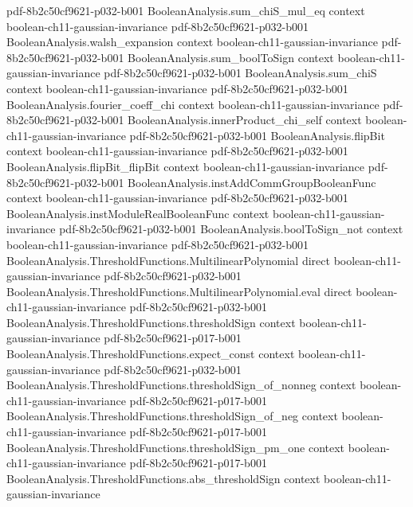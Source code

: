 \begin{theorem}
  {pdf-8b2c50cf9621-p032-b001}
\proofstep
  {BooleanAnalysis.sum_chiS_mul_eq}
  {context}
  {boolean-ch11-gaussian-invariance}
  {pdf-8b2c50cf9621-p032-b001}
\proofstep
  {BooleanAnalysis.walsh_expansion}
  {context}
  {boolean-ch11-gaussian-invariance}
  {pdf-8b2c50cf9621-p032-b001}
\proofstep
  {BooleanAnalysis.sum_boolToSign}
  {context}
  {boolean-ch11-gaussian-invariance}
  {pdf-8b2c50cf9621-p032-b001}
\proofstep
  {BooleanAnalysis.sum_chiS}
  {context}
  {boolean-ch11-gaussian-invariance}
  {pdf-8b2c50cf9621-p032-b001}
\proofstep
  {BooleanAnalysis.fourier_coeff_chi}
  {context}
  {boolean-ch11-gaussian-invariance}
  {pdf-8b2c50cf9621-p032-b001}
\proofstep
  {BooleanAnalysis.innerProduct_chi_self}
  {context}
  {boolean-ch11-gaussian-invariance}
  {pdf-8b2c50cf9621-p032-b001}
\proofstep
  {BooleanAnalysis.flipBit}
  {context}
  {boolean-ch11-gaussian-invariance}
  {pdf-8b2c50cf9621-p032-b001}
\proofstep
  {BooleanAnalysis.flipBit_flipBit}
  {context}
  {boolean-ch11-gaussian-invariance}
  {pdf-8b2c50cf9621-p032-b001}
\proofstep
  {BooleanAnalysis.instAddCommGroupBooleanFunc}
  {context}
  {boolean-ch11-gaussian-invariance}
  {pdf-8b2c50cf9621-p032-b001}
\proofstep
  {BooleanAnalysis.instModuleRealBooleanFunc}
  {context}
  {boolean-ch11-gaussian-invariance}
  {pdf-8b2c50cf9621-p032-b001}
\proofstep
  {BooleanAnalysis.boolToSign_not}
  {context}
  {boolean-ch11-gaussian-invariance}
  {pdf-8b2c50cf9621-p032-b001}
\proofstep
  {BooleanAnalysis.ThresholdFunctions.MultilinearPolynomial}
  {direct}
  {boolean-ch11-gaussian-invariance}
  {pdf-8b2c50cf9621-p032-b001}
\proofstep
  {BooleanAnalysis.ThresholdFunctions.MultilinearPolynomial.eval}
  {direct}
  {boolean-ch11-gaussian-invariance}
  {pdf-8b2c50cf9621-p032-b001}
\proofstep
  {BooleanAnalysis.ThresholdFunctions.thresholdSign}
  {context}
  {boolean-ch11-gaussian-invariance}
  {pdf-8b2c50cf9621-p017-b001}
\proofstep
  {BooleanAnalysis.ThresholdFunctions.expect_const}
  {context}
  {boolean-ch11-gaussian-invariance}
  {pdf-8b2c50cf9621-p032-b001}
\proofstep
  {BooleanAnalysis.ThresholdFunctions.thresholdSign_of_nonneg}
  {context}
  {boolean-ch11-gaussian-invariance}
  {pdf-8b2c50cf9621-p017-b001}
\proofstep
  {BooleanAnalysis.ThresholdFunctions.thresholdSign_of_neg}
  {context}
  {boolean-ch11-gaussian-invariance}
  {pdf-8b2c50cf9621-p017-b001}
\proofstep
  {BooleanAnalysis.ThresholdFunctions.thresholdSign_pm_one}
  {context}
  {boolean-ch11-gaussian-invariance}
  {pdf-8b2c50cf9621-p017-b001}
\proofstep
  {BooleanAnalysis.ThresholdFunctions.abs_thresholdSign}
  {context}
  {boolean-ch11-gaussian-invariance}

\end{theorem}
